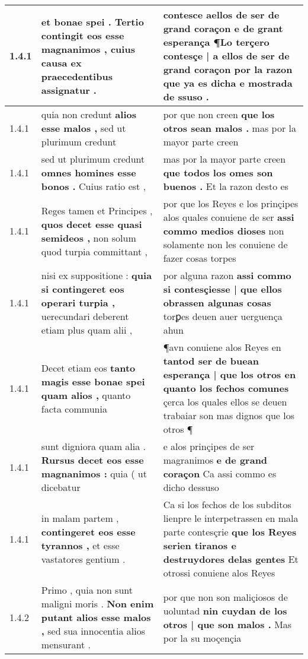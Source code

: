 \begin{tabular}{|p{1cm}|p{6.5cm}|p{6.5cm}|}
1.4.1 & et bonae spei . \textbf{ Tertio contingit eos esse magnanimos , } cuius causa ex praecedentibus assignatur . & contesce aellos de ser de grand coraçon e de grant esperança \textbf{ ¶Lo terçero contesçe | a ellos de ser de grand coraçon } por la razon que ya es dicha e mostrada de ssuso . \\\hline
1.4.1 & quia non credunt \textbf{ alios esse malos , } sed ut plurimum credunt & por que non creen \textbf{ que los otros sean malos . } mas por la mayor parte creen \\\hline
1.4.1 & sed ut plurimum credunt \textbf{ omnes homines esse bonos . } Cuius ratio est , & mas por la mayor parte creen \textbf{ que todos los omes son buenos . } Et la razon desto es \\\hline
1.4.1 & Reges tamen et Principes , \textbf{ quos decet esse quasi semideos , } non solum quod turpia committant , & por que los Reyes e los prinçipes alos quales conuiene de ser \textbf{ assi commo medios dioses } non solamente non les conuiene de fazer cosas torpes \\\hline
1.4.1 & nisi ex suppositione : \textbf{ quia si contingeret eos operari turpia , } uerecundari deberent etiam plus quam alii , & por alguna razon \textbf{ assi commo si contesçiesse | que ellos obrassen algunas cosas } torꝑes deuen auer uerguença ahun \\\hline
1.4.1 & Decet etiam eos \textbf{ tanto magis esse bonae spei quam alios , } quanto facta communia & ¶avn conuiene alos Reyes en \textbf{ tantod ser de buean esperança | que los otros en quanto los fechos comunes } çerca los quales ellos se deuen trabaiar son mas dignos que los otros ¶ \\\hline
1.4.1 & sunt digniora quam alia . \textbf{ Rursus decet eos esse magnanimos : } quia ( ut dicebatur & e alos prinçipes de ser magranimos \textbf{ e de grand coraçon } Ca assi commo es dicho dessuso \\\hline
1.4.1 & in malam partem , \textbf{ contingeret eos esse tyrannos , } et esse vastatores gentium . & Ca si los fechos de los subditos lienpre le interpetrassen en mala parte contesçrie \textbf{ que los Reyes serien tiranos e destruydores delas gentes } Et otrossi conuiene alos Reyes \\\hline
1.4.2 & Primo , quia non sunt maligni moris . \textbf{ Non enim putant alios esse malos , } sed sua innocentia alios mensurant . & por que non son maliçiosos de uoluntad \textbf{ nin cuydan de los otros | que son malos . } Mas por la su moçençia \\\hline

\end{tabular}
